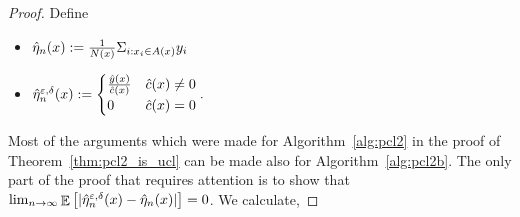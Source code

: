 \documentclass[12pt,a4paper,oneside,onecolumn]{book}
\begin{document}
\begin{proof}
Define
\begin{itemize}
    \item $\hat{\eta}_n(x) := \frac{1}{N(x)} \Sigma_{i:x_i \in A(x) }y_i$
    \item $\hat{\eta}^{\varepsilon,\delta}_n(x) := \begin{cases}
\frac{\hat{y}(x)}{\hat{c}(x)} & \hat{c}(x)\neq 0\\
0 & \hat{c}(x) = 0 
\end{cases}.$
\end{itemize}

Most of the arguments which were made for Algorithm~\ref{alg:pcl2} in the proof of Theorem~\ref{thm:pcl2_is_ucl}
can be made also for Algorithm~\ref{alg:pcl2b}.
The only part of the proof that requires attention is to show that
$\lim_{n\to\infty}\mathop{\mathbb{E}}\big[|\hat{\eta}^{\varepsilon,\delta}_n(x)-\hat{\eta}_n(x) |\big] = 0$. We calculate,


\end{proof}
\end{document}
